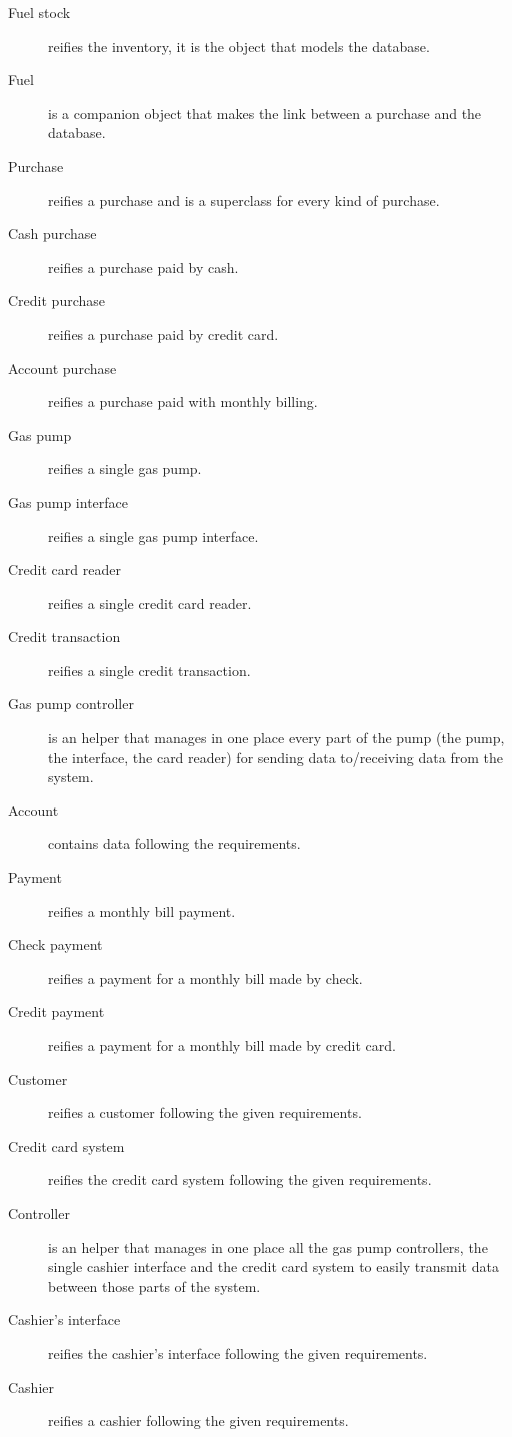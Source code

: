 \documentclass[a4paper, 11pt]{article}
\begin{document}
    \begin{description}
        \item[Fuel stock] reifies the inventory, it is the object that models
        the database.
        \item[Fuel] is a companion object that makes the link between a purchase
        and the database.
        \item[Purchase] reifies a purchase and is a superclass for every kind of
        purchase.
        \item[Cash purchase] reifies a purchase paid by cash.
        \item[Credit purchase] reifies a purchase paid by credit card.
        \item[Account purchase] reifies a purchase paid with monthly billing.
        \item[Gas pump] reifies a single gas pump.
        \item[Gas pump interface] reifies a single gas pump interface.
        \item[Credit card reader] reifies a single credit card reader.
        \item[Credit transaction] reifies a single credit transaction.
        \item[Gas pump controller] is an helper that manages in one place every
        part of the pump (the pump, the interface, the card reader) for sending
        data to/receiving data from the system.
        \item[Account] contains data following the requirements.
        \item[Payment] reifies a monthly bill payment.
        \item[Check payment] reifies a payment for a monthly bill made by check.
        \item[Credit payment] reifies a payment for a monthly bill made by credit card.
        \item[Customer] reifies a customer following the given requirements.
        \item[Credit card system] reifies the credit card system following the given
        requirements.
        \item[Controller] is an helper that manages in one place all the gas pump controllers,
        the single cashier interface and the credit card system to easily transmit
        data between those parts of the system.
        \item[Cashier's interface] reifies the cashier's interface following the given
        requirements.
        \item[Cashier] reifies a cashier following the given requirements.
    \end{description}
\end{document}
